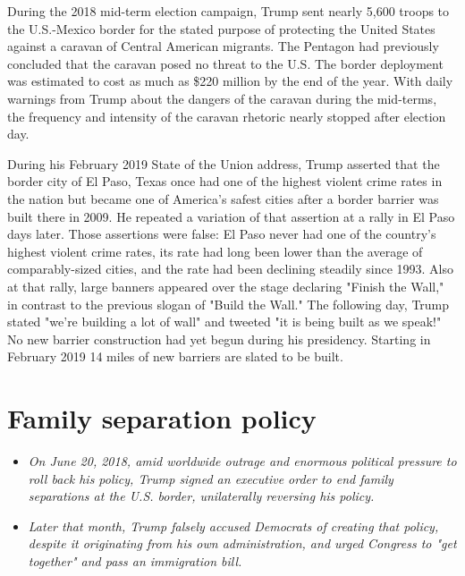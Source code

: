 During the 2018 mid-term election campaign, Trump sent nearly 5,600
troops to the U.S.-Mexico border for the stated purpose of protecting
the United States against a caravan of Central American migrants. The
Pentagon had previously concluded that the caravan posed no threat to
the U.S. The border deployment was estimated to cost as much as \$220
million by the end of the year. With daily warnings from Trump about the
dangers of the caravan during the mid-terms, the frequency and intensity
of the caravan rhetoric nearly stopped after election day.

During his February 2019 State of the Union address, Trump asserted that
the border city of El Paso, Texas once had one of the highest violent
crime rates in the nation but became one of America's safest cities
after a border barrier was built there in 2009. He repeated a variation
of that assertion at a rally in El Paso days later. Those assertions
were false: El Paso never had one of the country's highest violent crime
rates, its rate had long been lower than the average of comparably-sized
cities, and the rate had been declining steadily since 1993. Also at
that rally, large banners appeared over the stage declaring "Finish the
Wall," in contrast to the previous slogan of "Build the Wall." The
following day, Trump stated "we're building a lot of wall" and tweeted
"it is being built as we speak!" No new barrier construction had yet
begun during his presidency. Starting in February 2019 14 miles of new
barriers are slated to be built.

\section{Family separation policy}\label{family-separation-policy}

\begin{itemize}
\item
  \emph{On June 20, 2018, amid worldwide outrage and enormous political
  pressure to roll back his policy, Trump signed an executive order to
  end family separations at the U.S. border, unilaterally reversing his
  policy.}
\item
  \emph{Later that month, Trump falsely accused Democrats of creating
  that policy, despite it originating from his own administration, and
  urged Congress to "get together" and pass an immigration bill.}
\end{itemize}

